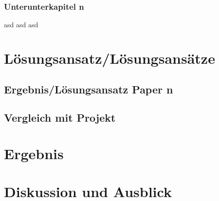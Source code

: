\documentclass[headsepline,titlepage,twoside,12pt]{report}
\newcommand\todo[1]{}%
\begin{document}
\subsection{Unterunterkapitel n}
asd asd asd

\chapter{Lösungsansatz/Lösungsansätze \todo{(bezogen auf Paper, 2--4 Seiten)}}
\todo{Kapitel 3 ist Vorschlag gedacht, der nicht wörtlich übernommen werden muss.
Der Lösungsansatz ist eine kurze Beschreibung der Arbeitshypothese sowie des Vorgehens zur Lösung der in der Einleitung beschriebenen Probleme.}

\section{Ergebnis/Lösungsansatz Paper n}
\section{Vergleich mit Projekt}

\chapter{Ergebnis \todo{der Seminararbeit, 1--2 Seiten, ihre Ergebnisse}}
\todo{
Im Ergebniskapitel soll beschrieben werden, inwiefern Sie Ihre in 1.2/1.3 aufgestellten Ziele bzw. Aufgaben im Rahmen der Seminararbeit erreicht wurden oder auch weshalb sie (teilweise) nicht erreicht werden konnten.
So soll es möglich sein, dass ein Leser von der Arbeit lediglich die Einleitung und die Zusammenfassung liest und doch die Ergebnisse der Arbeit erfassen kann.
Dieses Kapitel kann auch in mehrere Unterkapitel aufgeteilt werden, wenn das sinnvoll ist!
}

\chapter{Diskussion und Ausblick \todo{1--2 Seiten}}
\todo{
In der Diskussion wird das Ergebnis der Arbeit noch einmal kritisch bewertet.
Dies umfasst auch neue Probleme, die erst während der Bearbeitung erkannt wurden.
Die Eignung für ein konkretes Forschungsprojekt sollte hier diskutiert werden.
In der Diskussion kann auch die Kritik des Autors an dem stehen, was er in der Literatur zu dem zu bearbeitenden Thema hier und da gelesen hat.
Außerdem soll ein Ausblick gegeben werden, welche weiteren Fragestellungen noch bearbeitet werden sollten.
}
\end{document}
